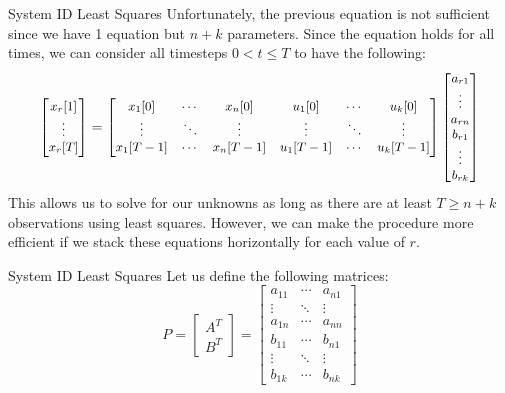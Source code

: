 \begin{frame}{System ID Least Squares}
	Unfortunately, the previous equation is not sufficient since we have 1 equation but $n+k$ parameters. Since the equation holds for all times, we can consider all timesteps $0<t\leq T$ to have the following:
	\[
		\small
		\begin{bmatrix}
			x_r[1] \\
			\vdots \\
			x_r[T] \\
		\end{bmatrix}
		=
		\begin{bmatrix}
			x_1[0] & \cdots & x_n[0] & u_1[0] & \cdots & u_k[0] \\
			\vdots & \ddots & \vdots & \vdots & \ddots & \vdots \\
			x_1[T-1] & \cdots & x_n[T-1] & u_1[T-1] & \cdots & u_k[T-1] \\
		\end{bmatrix}
		\begin{bmatrix}
			a_{r1} \\ 
			\vdots \\
			a_{rn} \\
			b_{r1} \\ 
			\vdots \\
			b_{rk} 
		\end{bmatrix}
	\]
	This allows us to solve for our unknowns as long as there are at least $T\geq n+k$ observations using least squares. However, we can make the procedure more efficient if we stack these equations horizontally for each value of $r$.
\end{frame}

\begin{frame}{System ID Least Squares}
	Let us define the following matrices:
	\[
		P 
		= 
		\begin{bmatrix}
			A^T \\ 
			B^T
		\end{bmatrix}
		=
		\begin{bmatrix}
			a_{11} & \cdots & a_{n1} \\
			\vdots & \ddots & \vdots \\
			a_{1n} & \cdots & a_{nn} \\
			b_{11} & \cdots & b_{n1} \\
			\vdots & \ddots & \vdots \\
			b_{1k} & \cdots & b_{nk}     
		\end{bmatrix}  
	\]
\end{frame}

